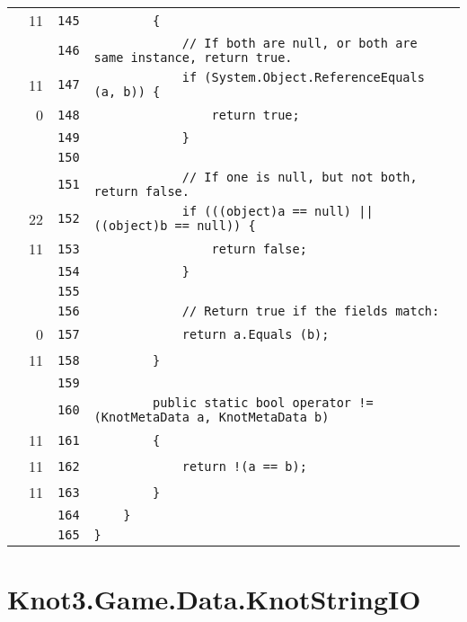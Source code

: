 \documentclass[a4paper,10pt]{article}
\begin{document}
\begin{longtable}[l]{lrrl}
\cellcolor{green} & 11 & \verb~145~ & \verb~        {~\\
\cellcolor{gray} &  & \verb~146~ & \verb~            // If both are null, or both are same instance, return true.~\\
\cellcolor{green} & 11 & \verb~147~ & \verb~            if (System.Object.ReferenceEquals (a, b)) {~\\
\cellcolor{red} & 0 & \verb~148~ & \verb~                return true;~\\
\cellcolor{gray} &  & \verb~149~ & \verb~            }~\\
\cellcolor{gray} &  & \verb~150~ & \verb~~\\
\cellcolor{gray} &  & \verb~151~ & \verb~            // If one is null, but not both, return false.~\\
\cellcolor{green} & 22 & \verb~152~ & \verb~            if (((object)a == null) || ((object)b == null)) {~\\
\cellcolor{green} & 11 & \verb~153~ & \verb~                return false;~\\
\cellcolor{gray} &  & \verb~154~ & \verb~            }~\\
\cellcolor{gray} &  & \verb~155~ & \verb~~\\
\cellcolor{gray} &  & \verb~156~ & \verb~            // Return true if the fields match:~\\
\cellcolor{red} & 0 & \verb~157~ & \verb~            return a.Equals (b);~\\
\cellcolor{green} & 11 & \verb~158~ & \verb~        }~\\
\cellcolor{gray} &  & \verb~159~ & \verb~~\\
\cellcolor{gray} &  & \verb~160~ & \verb~        public static bool operator != (KnotMetaData a, KnotMetaData b)~\\
\cellcolor{green} & 11 & \verb~161~ & \verb~        {~\\
\cellcolor{green} & 11 & \verb~162~ & \verb~            return !(a == b);~\\
\cellcolor{green} & 11 & \verb~163~ & \verb~        }~\\
\cellcolor{gray} &  & \verb~164~ & \verb~    }~\\
\cellcolor{gray} &  & \verb~165~ & \verb~}~\\
\end{longtable}
\newpage
\section{Knot3.Game.Data.KnotStringIO}
\end{document}

